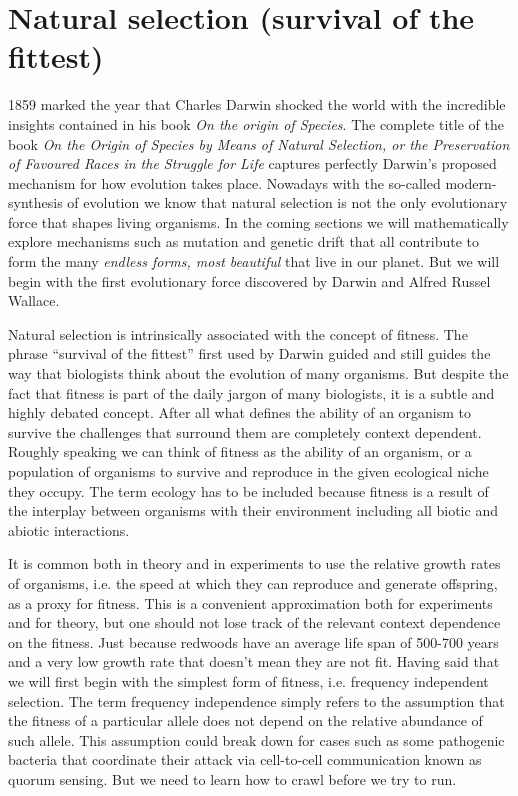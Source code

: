 \section{Natural selection (survival of the fittest)}
1859 marked the year that Charles Darwin shocked the world with the incredible
insights contained in his book \textit{On the origin of Species}. The complete 
title of the book \textit{On the Origin of Species by Means of Natural
Selection, or the Preservation of Favoured Races in the Struggle for Life}
captures perfectly Darwin's proposed mechanism for how evolution takes place.
Nowadays with the so-called modern-synthesis of evolution we know that natural
selection is not the only evolutionary force that shapes living organisms. In
the coming sections we will mathematically explore mechanisms such as mutation
and genetic drift that all contribute to form the many \textit{endless forms,
most beautiful} that live in our planet. But we will begin with the first
evolutionary force discovered by Darwin and Alfred Russel Wallace.

Natural selection is intrinsically associated with the concept of fitness. The
phrase ``survival of the fittest'' first used by Darwin guided and still guides
the way that biologists think about the evolution of many organisms. But
despite the fact that fitness is part of the daily jargon of many biologists,
it is a subtle and highly debated concept. After all what defines the ability
of an organism to survive the challenges that surround them are completely
context dependent. Roughly speaking we can think of fitness as the ability of
an organism, or a population of organisms to survive and reproduce in the given
ecological niche they occupy. The term ecology has to be included because
fitness is a result of the interplay between organisms with their environment
including all biotic and abiotic interactions. 

It is common both in theory and in experiments to use the relative growth rates
of organisms, i.e. the speed at which they can reproduce and generate
offspring, as a proxy for fitness. This is a convenient approximation both
for experiments and for theory, but one should not lose track of the relevant
context dependence on the fitness. Just because redwoods have an average life
span of 500-700 years and a very low growth rate that doesn't mean they are not
fit. Having said that we will first begin with the simplest form of fitness,
i.e. frequency independent selection. The term frequency independence simply
refers to the assumption that the fitness of a particular allele does not
depend on the relative abundance of such allele. This assumption could break
down for cases such as some pathogenic bacteria that coordinate their attack
via cell-to-cell communication known as quorum sensing. But we need to learn
how to crawl before we try to run.

